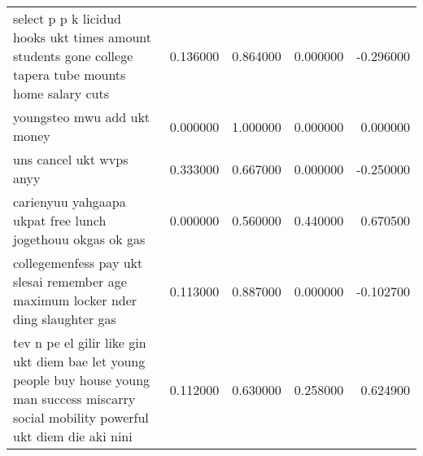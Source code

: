 \begin{tabular}{lrrrr}
select p p k licidud hooks ukt times amount students gone college tapera tube mounts home salary cuts & 0.136000 & 0.864000 & 0.000000 & -0.296000 \\
youngsteo mwu add ukt money & 0.000000 & 1.000000 & 0.000000 & 0.000000 \\
uns cancel ukt wvps anyy & 0.333000 & 0.667000 & 0.000000 & -0.250000 \\
carienyuu yahgaapa ukpat free lunch jogethouu okgas ok gas & 0.000000 & 0.560000 & 0.440000 & 0.670500 \\
collegemenfess pay ukt slesai remember age maximum locker nder ding slaughter gas & 0.113000 & 0.887000 & 0.000000 & -0.102700 \\
tev n pe el gilir like gin ukt diem bae let young people buy house young man success miscarry social mobility powerful ukt diem die aki nini & 0.112000 & 0.630000 & 0.258000 & 0.624900 \\
\bottomrule
\end{tabular}
